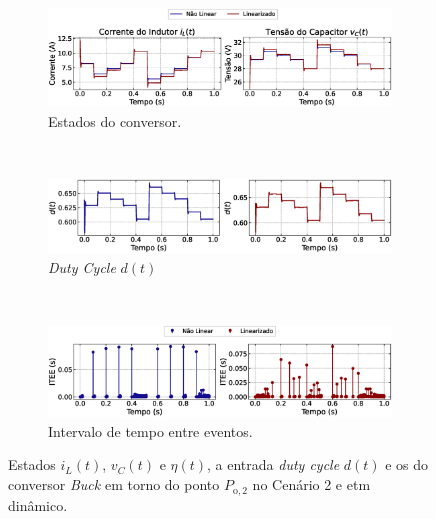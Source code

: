 \begin{figure}[H]
  \centering
  \captionsetup{justification=centering}
  \begin{subfigure}{1.\textwidth}
    \centering
    \includegraphics[width=1.\textwidth]{figuras/dynamic-etm/buck/sim2/op2/result.eps}
    \caption{Estados do conversor.}
    \label{fig:buck_converter_variable_pcpl_dynamic_etm_op2_a}
  \end{subfigure}
  \\[6pt]
  \begin{subfigure}{1.\textwidth}
    \centering
    \includegraphics[width=1.\textwidth]{figuras/dynamic-etm/buck/sim2/op2/duty-cycle.eps}
    \caption{\textit{Duty Cycle} $d(t)$}
    \label{fig:buck_converter_variable_pcpl_dynamic_etm_op2_b}
  \end{subfigure}
  \\[6pt]
  \begin{subfigure}{1.\textwidth}
    \centering
    \includegraphics[width=1.\textwidth]{figuras/dynamic-etm/buck/sim2/op2/inter-event-times.eps}
    \caption{Intervalo de tempo entre eventos.}
    \label{fig:buck_converter_variable_pcpl_dynamic_etm_op2_c}
  \end{subfigure}
  \caption{Estados $i_L(t)$, $v_C(t)$ e $\eta(t)$, a entrada \textit{duty cycle} $d(t)$ e os  do conversor \textit{Buck} em torno do ponto $P_{\mathrm{o}, 2}$ no Cenário 2 e \acrshort{etm} dinâmico.}
  \label{fig:buck_converter_variable_pcpl_dynamic_etm_op2}
\end{figure}

